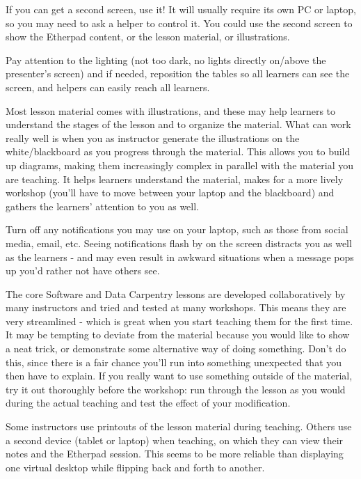 If you can get a second screen, use it! It will usually require its own
PC or laptop, so you may need to ask a helper to control it. You could
use the second screen to show the Etherpad content, or the lesson
material, or illustrations.

Pay attention to the lighting (not too dark, no lights directly on/above
the presenter's screen) and if needed, reposition the tables so all
learners can see the screen, and helpers can easily reach all learners.


Most lesson material comes with illustrations, and these may help
learners to understand the stages of the lesson and to organize the
material. What can work really well is when you as instructor generate
the illustrations on the white/blackboard as you progress through the
material. This allows you to build up diagrams, making them increasingly
complex in parallel with the material you are teaching. It helps
learners understand the material, makes for a more lively workshop
(you'll have to move between your laptop and the blackboard) and gathers
the learners' attention to you as well.


Turn off any notifications you may use on your laptop, such as those
from social media, email, etc. Seeing notifications flash by on the
screen distracts you as well as the learners - and may even result in
awkward situations when a message pops up you'd rather not have others
see.


The core Software and Data Carpentry lessons are developed
collaboratively by many instructors and tried and tested at many
workshops. This means they are very streamlined - which is great when
you start teaching them for the first time. It may be tempting to
deviate from the material because you would like to show a neat trick,
or demonstrate some alternative way of doing something. Don't do this,
since there is a fair chance you'll run into something unexpected that
you then have to explain. If you really want to use something outside of
the material, try it out thoroughly before the workshop: run through the
lesson as you would during the actual teaching and test the effect of
your modification.

Some instructors use printouts of the lesson material during teaching.
Others use a second device (tablet or laptop) when teaching, on which
they can view their notes and the Etherpad session. This seems to be
more reliable than displaying one virtual desktop while flipping back
and forth to another.

